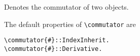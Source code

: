 
Denotes the commutator of two objects.

The default properties of \verb|\commutator| are
\begin{verbatim}
\commutator{#}::IndexInherit.
\commutator{#}::Derivative.
\end{verbatim}




